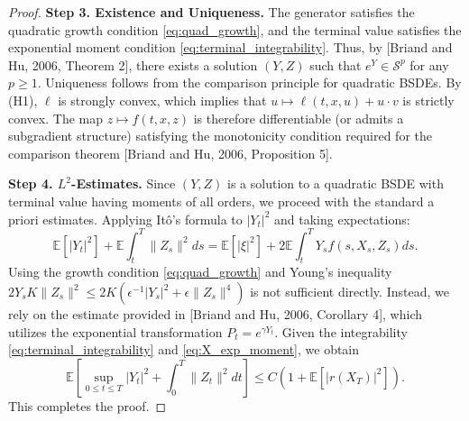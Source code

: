 \documentclass[11pt]{article}
\begin{document}
\begin{proof}
\noindent\textbf{Step 3. Existence and Uniqueness.}
The generator satisfies the quadratic growth condition \eqref{eq:quad_growth}, and the terminal value satisfies the exponential moment condition \eqref{eq:terminal_integrability}.
Thus, by [Briand and Hu, 2006, Theorem 2], there exists a solution $(Y, Z)$ such that $e^{Y} \in \mathcal{S}^p$ for any $p \ge 1$.
Uniqueness follows from the comparison principle for quadratic BSDEs.
By (H1), $\ell$ is strongly convex, which implies that $u \mapsto \ell(t,x,u) + u \cdot v$ is strictly convex.
The map $z \mapsto f(t,x,z)$ is therefore differentiable (or admits a subgradient structure) satisfying the monotonicity condition required for the comparison theorem [Briand and Hu, 2006, Proposition 5].

\noindent\textbf{Step 4. $L^2$-Estimates.}
Since $(Y,Z)$ is a solution to a quadratic BSDE with terminal value having moments of all orders, we proceed with the standard a priori estimates.
Applying It\^o's formula to $|Y_t|^2$ and taking expectations:
\begin{equation*}
    \mathbb{E}[|Y_t|^2] + \mathbb{E}\int_t^T \|Z_s\|^2 ds = \mathbb{E}[|\xi|^2] + 2\mathbb{E}\int_t^T Y_s f(s, X_s, Z_s) ds.
\end{equation*}
Using the growth condition \eqref{eq:quad_growth} and Young's inequality $2Y_s K \|Z_s\|^2 \le 2K (\epsilon^{-1} |Y_s|^2 + \epsilon \|Z_s\|^4)$ is not sufficient directly.
Instead, we rely on the estimate provided in [Briand and Hu, 2006, Corollary 4], which utilizes the exponential transformation $P_t = e^{\gamma Y_t}$.
Given the integrability \eqref{eq:terminal_integrability} and \eqref{eq:X_exp_moment}, we obtain
\begin{equation}
    \mathbb{E}\left[ \sup_{0 \le t \le T} |Y_t|^2 + \int_0^T \|Z_t\|^2 dt \right] \le C \left( 1 + \mathbb{E}[|r(X_T)|^2] \right).
\end{equation}
This completes the proof.
\end{proof}
\end{document}
